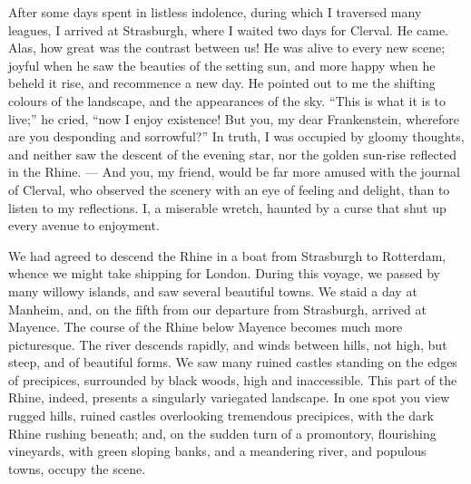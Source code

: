 After some days spent in listless indolence,
during which I traversed many
leagues, I arrived at Strasburgh, where I
waited two days for Clerval. He came.
Alas, how great was the contrast between
us! He was alive to every new scene; joyful
when he saw the beauties of the setting
sun, and more happy when he beheld
it rise, and recommence a new day. He
pointed out to me the shifting colours
of the landscape, and the appearances
of the sky. ``This is what it is to
live;'' he cried, ``now I enjoy existence!
But you, my dear Frankenstein, wherefore
are you desponding and sorrowful?''
In truth, I was occupied by
gloomy thoughts, and neither saw the
descent of the evening star, nor the
golden sun-rise reflected in the Rhine. --- And
you, my friend, would be far more
amused with the journal of Clerval,
who observed the scenery with an eye
of feeling and delight, than to listen to
my reflections. I, a miserable wretch,
haunted by a curse that shut up every
avenue to enjoyment.

We had agreed to descend the Rhine
in a boat from Strasburgh to Rotterdam,
whence we might take shipping
for London. During this voyage, we
passed by many willowy islands, and
saw several beautiful towns. We staid
a day at Manheim, and, on the fifth
from our departure from Strasburgh,
arrived at Mayence. The course of the
Rhine below Mayence becomes much
more picturesque. The river descends
rapidly, and winds between hills, not
high, but steep, and of beautiful forms.
We saw many ruined castles standing
on the edges of precipices, surrounded
by black woods, high and inaccessible.
This part of the Rhine, indeed, presents
a singularly variegated landscape.
In one spot you view rugged hills,
ruined castles overlooking tremendous
precipices, with the dark Rhine rushing
beneath; and, on the sudden turn of a
promontory, flourishing vineyards, with
green sloping banks, and a meandering
river, and populous towns, occupy the
scene.

